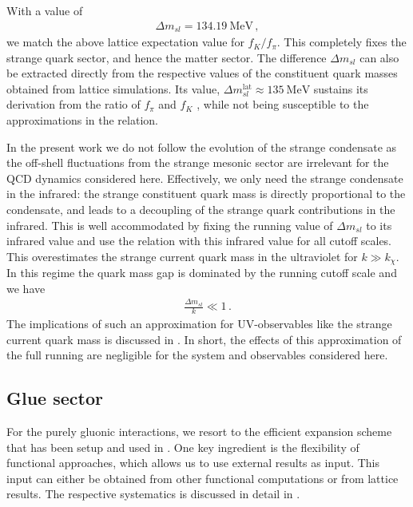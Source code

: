 \documentclass[aps,twocolumn,prd,superscriptaddress]{revtex4-2}
\begin{document}
%
With a value of
%
\begin{align} 
	\Delta m_{sl} = \qty{134.19}{\MeV}\,,
\label{eq:DeltamfRG}
\end{align}
%
we match the above lattice expectation value for $f_K/f_\pi$. This completely fixes the strange quark sector, and hence the matter sector. The difference $\Delta m_{sl}$ can also be extracted directly from the respective values of the constituent quark masses obtained from lattice simulations. Its value, $\Delta m_{sl}^\textrm{lat} \approx \qty{135}{\MeV}$ sustains its derivation from the ratio of $f_\pi$ and $f_K$ \cite{Aoki:2013ldr}, while not being susceptible to the approximations in the relation. 

In the present work we do not follow the evolution of the strange condensate as the off-shell fluctuations from the strange mesonic sector are irrelevant for the QCD dynamics considered here. Effectively, we only need the strange condensate in the infrared: the strange constituent quark mass is directly proportional to the condensate, and leads to a decoupling of the strange quark contributions in the infrared. This is well accommodated by fixing the running value of $\Delta m_{sl}$ to its infrared value  and use the relation  with this infrared value for all cutoff scales. This overestimates the strange current quark mass in the ultraviolet for $k\gg k_\chi$. In this regime the quark mass gap is dominated by the running cutoff scale and we have 
%
\begin{align} 
	\frac{\Delta m_{sl}}{k} \ll 1\,.
\label{eq:mslkEstimate}	
\end{align}
%
The implications of such an approximation for UV-observables like the strange current quark mass is discussed in . In short, the effects of this approximation of the full running are negligible for the system and observables considered here.


\subsection{Glue sector} \label{sec:GluonicSector}

For the purely gluonic interactions, we resort to the efficient expansion scheme that has been setup and used in \cite{Braun:2014ata,Fu:2019hdw, Braun:2020ada}. One key ingredient is the flexibility of functional approaches, which allows us to use external results as input. This input can either be obtained from other functional computations or from lattice results. The respective systematics is discussed in detail in . 
\end{document}

